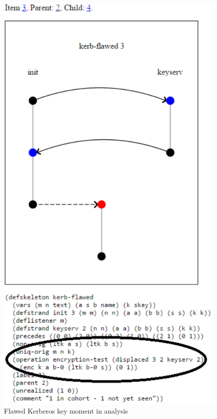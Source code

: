 \begin{figure}
\begin{center}
\includegraphics[scale=0.8]{kerb_skel3_operation_circled}
\end{center}
\caption{Flawed Kerberos key moment in analysis}
\label{fig:kerb-skel3}
\end{figure}

